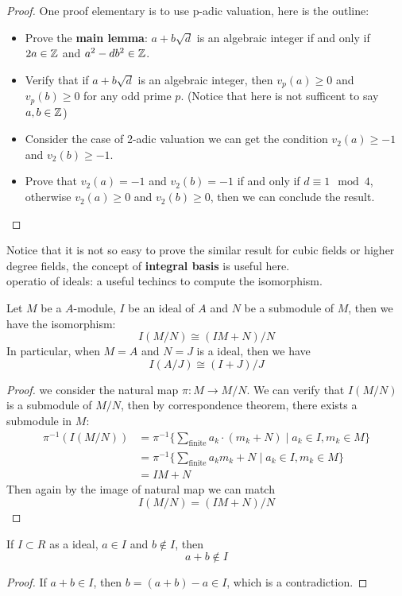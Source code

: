 \documentclass[12pt,a4paper]{article}
\begin{document}
\begin{proof}
    One proof elementary is to use p-adic valuation, here is the outline:
    \begin{itemize}
        \item Prove the \textbf{main lemma}: \(a+b\sqrt{d}\) is an algebraic integer if and only if \(2a \in \mathbb{Z}\) and \(a^2 - db^2 \in \mathbb{Z}\).
        \item Verify that if \(a+b\sqrt{d}\) is an algebraic integer, then \(v_p(a)\geq 0\) and \(v_p(b) \geq 0\) for any odd prime \(p\). (Notice that here is not sufficent to say \(a,b \in \mathbb{Z}\))
        \item Consider the case of 2-adic valuation we can get the condition \(v_2(a) \geq -1\) and \(v_2(b) \geq -1\).
        \item Prove that \(v_2(a) = -1 \) and \(v_2(b) = -1\) if and only if \(d \equiv 1 \mod 4\), otherwise \(v_2(a) \geq 0\) and \(v_2(b) \geq 0\), then we can conclude the result.
    \end{itemize}
\end{proof}
Notice that it is not so easy to prove the similar result for cubic fields or higher degree fields, the concept of \textbf{integral basis} is useful here.\\

operatio of ideals: a useful techincs to compute the isomorphism.
\begin{proposition}
    Let \(M\) be a \(A\)-module, \(I\) be an ideal of \(A\) and \(N\) be a submodule of \(M\), then we have the isomorphism:
    \[I(M/N) \cong (IM+N)/N\]
    In particular, when \(M=A\) and \(N = J\) is a ideal, then we have
    \[I(A/J) \cong (I+J)/J\]
\end{proposition}
\begin{proof}
    we consider the natural map \(\pi: M \to M/N\). We can verify that \(I(M/N)\) is a submodule of \(M/N\), then by correspondence theorem, there exists a submodule in \(M\):
    \begin{align*}
    \pi^{-1}(I(M/N)) &= \pi^{-1}\{\sum_{\text{finite}}a_k\cdot(m_k+N) \mid a_k \in I, m_k \in M \}\\
    &= \pi^{-1}\{\sum_{\text{finite}} a_k m_k + N \mid a_k \in I, m_k \in M\} \\
    &= IM + N
    \end{align*}
    Then again by the image of natural map we can match
    \[I(M/N) = (IM+N)/N\]
\end{proof}

\begin{proposition}
    If \(I \subset R\) as a ideal, \(a \in I\) and \(b \notin I\), then 
    \[a+b \notin I\]
\end{proposition}
\begin{proof}
    If \(a+b \in I\), then \(b = (a+b) - a \in I\), which is a contradiction.
\end{proof}\
\end{document}

